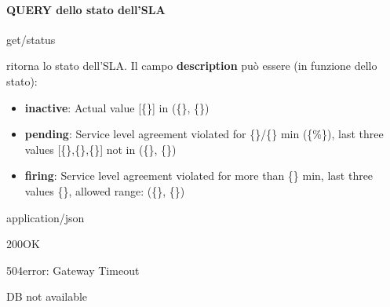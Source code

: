 \paragraph{QUERY dello stato dell’SLA}
\begin{apiRoute}{get}{/status}{ritorna lo stato dell'SLA. Il campo \textbf{description} può essere (in funzione dello stato): 
            \begin{itemize}
                \item \textbf{inactive}: Actual value [\{\}] in (\{\}, \{\})
                \item \textbf{pending}: Service level agreement violated for \{\}/\{\} min (\{\%\}), last three values [\{\},\{\},\{\}] not in (\{\}, \{\})
                \item \textbf{firing}: Service level agreement violated for more than \{\} min, last three values \{\}, allowed range: (\{\}, \{\})
            \end{itemize}
        }
    	\begin{routeParameter}
    	\end{routeParameter}
    	\begin{routeResponse}{application/json}
    		\begin{routeResponseItem}{200}{OK}
    			\begin{routeResponseItemBody}
    			\end{routeResponseItemBody}
    		\end{routeResponseItem}
    		\begin{routeResponseItem}{504}{error: Gateway Timeout}
    			\begin{routeResponseItemBody}
DB not available
    			\end{routeResponseItemBody}
    		\end{routeResponseItem}
    	\end{routeResponse}
    	
    \end{apiRoute}

\newpage
